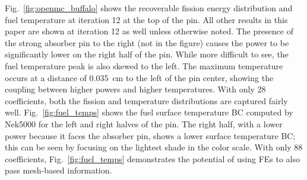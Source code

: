 \documentclass[letterpaper]{physor2018}
\begin{document}
Fig.~\ref{fig:openmc_buffalo} shows the recoverable fission energy distribution
and fuel temperature
 at iteration 12 at the top of the pin. All other results in this
 paper are shown at iteration 12 as well unless otherwise noted. The presence of the
strong absorber pin to the right (not in the figure) causes the power to be significantly
lower on the right half of the pin. While more
difficult to see, the fuel temperature peak is also skewed to the left. The maximum
temperature occurs at a distance of \SI{0.035}{\centi\meter} to the left of the pin center,
showing the coupling between higher powers and higher temperatures.
With only 28 coefficients, both the fission and temperature distributions are
captured fairly well. Fig.~\ref{fig:fuel_temps} shows the fuel surface temperature
BC computed by Nek5000 for the left and right halves of the pin. The right half,
with a lower power because it faces the absorber pin, shows a lower
surface temperature BC; this can be seen by focusing
on the lightest shade in the color scale.
With only 88 coefficients, Fig.~\ref{fig:fuel_temps}
demonstrates the potential of using FEs to also pass mesh-based information.
\end{document}
